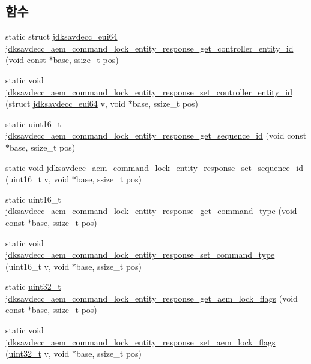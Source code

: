 \subsection*{함수}
\begin{DoxyCompactItemize}
\item 
static struct \hyperlink{structjdksavdecc__eui64}{jdksavdecc\+\_\+eui64} \hyperlink{group__command__lock__entity__response_gac79d4d530768959d1e1d1dca0ddc6bf2}{jdksavdecc\+\_\+aem\+\_\+command\+\_\+lock\+\_\+entity\+\_\+response\+\_\+get\+\_\+controller\+\_\+entity\+\_\+id} (void const $\ast$base, ssize\+\_\+t pos)
\item 
static void \hyperlink{group__command__lock__entity__response_gaca585dc794c73e7aa89e31ec2b510d17}{jdksavdecc\+\_\+aem\+\_\+command\+\_\+lock\+\_\+entity\+\_\+response\+\_\+set\+\_\+controller\+\_\+entity\+\_\+id} (struct \hyperlink{structjdksavdecc__eui64}{jdksavdecc\+\_\+eui64} v, void $\ast$base, ssize\+\_\+t pos)
\item 
static uint16\+\_\+t \hyperlink{group__command__lock__entity__response_gad0c1026defddf61d6e7110336d1874b5}{jdksavdecc\+\_\+aem\+\_\+command\+\_\+lock\+\_\+entity\+\_\+response\+\_\+get\+\_\+sequence\+\_\+id} (void const $\ast$base, ssize\+\_\+t pos)
\item 
static void \hyperlink{group__command__lock__entity__response_gab3facfbb5485d030454ecf3f7531651c}{jdksavdecc\+\_\+aem\+\_\+command\+\_\+lock\+\_\+entity\+\_\+response\+\_\+set\+\_\+sequence\+\_\+id} (uint16\+\_\+t v, void $\ast$base, ssize\+\_\+t pos)
\item 
static uint16\+\_\+t \hyperlink{group__command__lock__entity__response_gafe65b82f07ba2b46993b7d42b66aed47}{jdksavdecc\+\_\+aem\+\_\+command\+\_\+lock\+\_\+entity\+\_\+response\+\_\+get\+\_\+command\+\_\+type} (void const $\ast$base, ssize\+\_\+t pos)
\item 
static void \hyperlink{group__command__lock__entity__response_ga73b0d8454c7f944f712fdfd2d490f816}{jdksavdecc\+\_\+aem\+\_\+command\+\_\+lock\+\_\+entity\+\_\+response\+\_\+set\+\_\+command\+\_\+type} (uint16\+\_\+t v, void $\ast$base, ssize\+\_\+t pos)
\item 
static \hyperlink{parse_8c_a6eb1e68cc391dd753bc8ce896dbb8315}{uint32\+\_\+t} \hyperlink{group__command__lock__entity__response_ga6cde0132db7228f3804d6366add4b3b5}{jdksavdecc\+\_\+aem\+\_\+command\+\_\+lock\+\_\+entity\+\_\+response\+\_\+get\+\_\+aem\+\_\+lock\+\_\+flags} (void const $\ast$base, ssize\+\_\+t pos)
\item 
static void \hyperlink{group__command__lock__entity__response_ga451d11f9fea73aca3498d9c12e684c18}{jdksavdecc\+\_\+aem\+\_\+command\+\_\+lock\+\_\+entity\+\_\+response\+\_\+set\+\_\+aem\+\_\+lock\+\_\+flags} (\hyperlink{parse_8c_a6eb1e68cc391dd753bc8ce896dbb8315}{uint32\+\_\+t} v, void $\ast$base, ssize\+\_\+t pos)

\end{DoxyCompactItemize}
